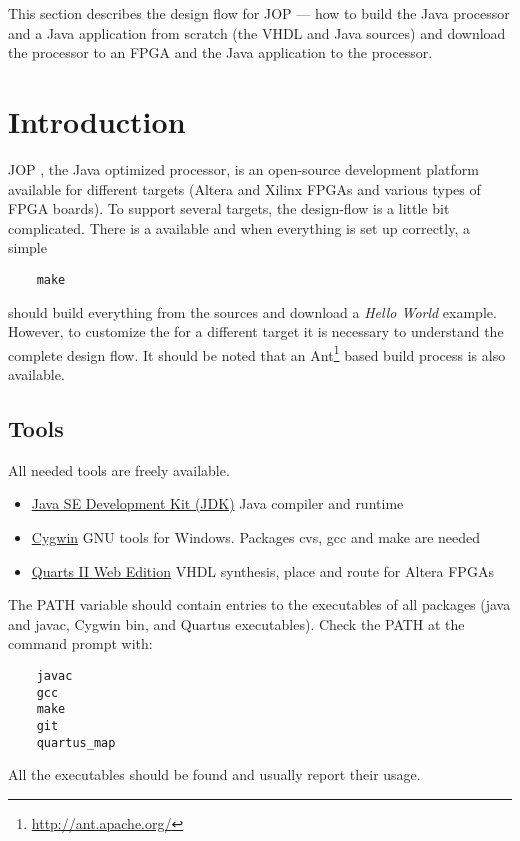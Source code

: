 
This section describes the design flow for JOP --- how to build the
Java processor and a Java application from scratch (the VHDL and
Java sources) and download the processor to an FPGA and the Java
application to the processor.


\section{Introduction}

JOP \cite{jop:thesis}, the Java optimized processor, is an
open-source development platform available for different targets
(Altera and Xilinx FPGAs and various types of FPGA boards). To
support several targets, the design-flow is a little bit complicated.
There is a  available and when everything is set up
correctly, a simple
%
\begin{lstlisting}
    make
\end{lstlisting}
%
should build everything from the sources and download a \emph{Hello
World} example. However, to customize the  for a
different target it is necessary to understand the complete design
flow. It should be noted that an
Ant\footnote{\url{http://ant.apache.org/}} based build process is
also available.

\subsection{Tools}

All needed tools are freely available.
%
\begin{itemize}
    \item  \href{http://java.sun.com/javase/downloads/index.jsp}%
{Java SE Development Kit (JDK)}  Java compiler and runtime
    \item  \href{http://www.cygwin.com/}%
{Cygwin} GNU tools for Windows. Packages cvs, gcc and make are
needed
    \item  \href{https://www.altera.com/support/software/download/altera_design/quartus_we/dnl-quartus_we.jsp}%
{Quarts II Web Edition} VHDL synthesis, place and route for Altera
FPGAs

\end{itemize}
%
The PATH variable should contain entries to the executables of all
packages (java and javac, Cygwin bin, and Quartus executables). Check
the PATH at the command prompt with:
%
\begin{lstlisting}
    javac
    gcc
    make
    git
    quartus_map
\end{lstlisting}
%
All the executables should be found and usually report their usage.

